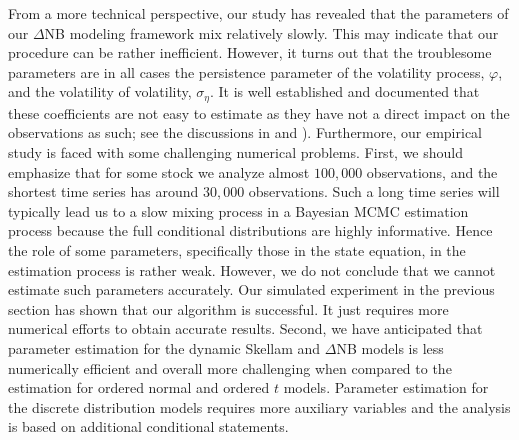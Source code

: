 \documentclass[12pt]{article}
\begin{document}
From a more technical perspective, our study has revealed that 
the parameters of our $\Delta$NB modeling framework mix relatively slowly.
This may indicate that our procedure can be rather inefficient.
However, it turns out that the troublesome parameters are in all
cases the persistence parameter of the volatility process, $\varphi$, and
the volatility of volatility, $\sigma _{\eta}$.
It is well established and documented that these coefficients are not easy to
estimate as they have not a direct impact on the observations as such; see
the discussions in \citet{KimShephardChib1998} and \citet{JohannesStroud2014}).
Furthermore, our empirical study is faced with some challenging numerical problems.
First, we should emphasize that for some stock we analyze almost $100,000$ observations, and the shortest time series has around  $30,000$ observations.
Such a long time series will typically lead us to a slow
mixing process in a Bayesian MCMC estimation process because the full conditional distributions
are highly informative. Hence the role of some parameters, specifically those in
the state equation, in the estimation process is rather weak.
However, we do not conclude that we cannot estimate
such parameters accurately. Our simulated experiment in the
previous section has shown that our algorithm is successful.
It just requires more numerical efforts to obtain accurate results.
Second, we have anticipated that parameter estimation for the dynamic
Skellam and $\Delta$NB models is less numerically efficient and overall more challenging
when compared to the estimation for ordered normal and ordered $t$ models.
Parameter estimation for the discrete distribution models requires more auxiliary
variables and the analysis is based on additional conditional statements.

%




%
\end{document}
